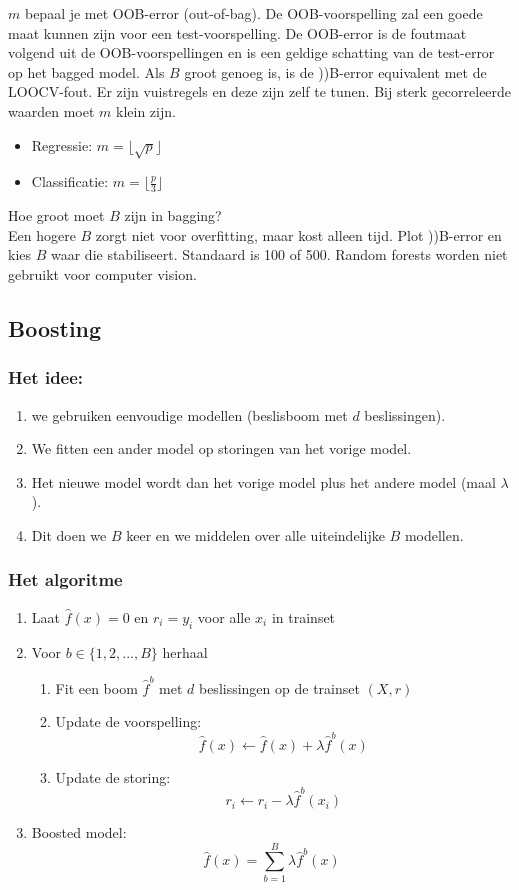 {\noindent $m$ bepaal je met OOB-error (out-of-bag). De OOB-voorspelling zal een goede maat kunnen zijn voor een test-voorspelling. De OOB-error is de foutmaat volgend uit de OOB-voorspellingen en is een geldige schatting van de test-error op het bagged model. Als $B$ groot genoeg is, is de ))B-error equivalent met de LOOCV-fout. Er zijn vuistregels en deze zijn zelf te tunen. Bij sterk gecorreleerde waarden moet $m$ klein zijn.\\
\begin{itemize}
    \item Regressie: $m=\lfloor \sqrt{p}\rfloor$ 
    \item Classificatie:  $m=\lfloor \frac{p}{3}\rfloor$ 
\end{itemize}
Hoe groot moet $B$ zijn in bagging?\\
Een hogere $B$ zorgt niet voor overfitting, maar kost alleen tijd. Plot ))B-error en kies $B$ waar die stabiliseert. Standaard is 100 of 500. Random forests worden niet gebruikt voor computer vision.\\

\subsection{Boosting}
\subsubsection{Het idee:}
\begin{enumerate}
    \item we gebruiken eenvoudige modellen (beslisboom met $d$ beslissingen).
    \item We fitten een ander model op storingen van het vorige model.
    \item Het nieuwe model wordt dan het vorige model plus het andere model (maal $\lambda$).
    \item Dit doen we $B$ keer en we middelen over alle uiteindelijke $B$ modellen.
\end{enumerate}

\subsubsection{Het algoritme}
\begin{enumerate}
    \item Laat $\hat{f}(x)=0$ en $r_i=y_i$ voor alle $x_i$ in trainset
    \item Voor $b \in \{1,2,...,B\}$ herhaal
    \begin{enumerate}
        \item Fit een boom $\hat{f}^b$ met $d$ beslissingen op de trainset $(X,r)$
        \item Update de voorspelling:
        \[\hat{f}(x) \leftarrow \hat{f}(x)+ \lambda\hat{f}^b(x) \]
        \item Update de storing:
        \[r_i \leftarrow r_i-\lambda\hat{f}^b(x_i)\]
    \end{enumerate}
    \item Boosted model:
    \[\hat{f}(x)=\sum\limits_{b=1}^B\lambda\hat{f}^b(x)\]
\end{enumerate}

}
